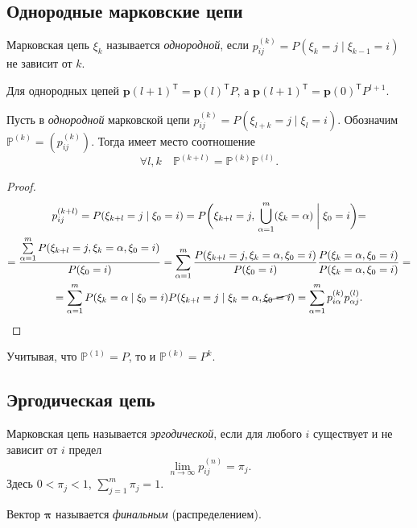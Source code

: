\subsection{Однородные марковские цепи}
\begin{definition}
  Марковская цепь $\xi_k$ называется \emph{однородной}, если $p_{ij}^{(k)} =
  P(\xi_k=j \mid \xi_{k-1}=i)$ не
  зависит от $ k $.
\end{definition}
Для однородных цепей $\mathbf{p}(l+1)^{\mathsf T} = \mathbf{p}(l)^{\mathsf T} P$, а
$\mathbf{p}(l+1)^{\mathsf T} = \mathbf{p}(0)^{\mathsf T} P^{l+1}$.

\begin{theorem}
  Пусть в \emph{однородной} марковской цепи $p_{ij}^{(k)} = P(\xi_{l+k} = j \mid
  \xi_l=i)$. Обозначим
  $\mathbb{P}^{(k)} = (p_{ij}^{(k)})$. Тогда имеет место соотношение
  \[
    \forall l, k \quad \mathbb{P}^{(k+l)} = \mathbb{P}^{(k)} \mathbb{P}^{(l)}.
  \]
\end{theorem}
\begin{proof}
  \begin{multline*}
    p_{ij}^{(k+l)} = P(\xi_{k+l}=j \mid \xi_0 = i)
    = P\biggl(\xi_{k+l}=j,\, \bigcup_{\alpha=1}^m (\xi_k=\alpha) \biggm| \xi_0 =
      i\biggl) = \\
    = \dfrac{\sum\limits_{\alpha=1}^m P(\xi_{k+l} = j, \xi_k = \alpha, \xi_0=i)}{P(\xi_0=i)}
    = \sum_{\alpha=1}^m \dfrac{P(\xi_{k+l} = j, \xi_k = \alpha, \xi_0=i)}{P(\xi_0=i)} \dfrac{P(\xi_k=\alpha, \xi_0=i)}{P(\xi_k=\alpha, \xi_0=i)} = \\
    = \sum_{\alpha=1}^m P(\xi_k=\alpha\mid\xi_0=i) P(\xi_{k+l}=j \mid \xi_k = \alpha, \cancel{\xi_0=i})
    = \sum_{\alpha=1}^m p_{i\alpha}^{(k)} p_{\alpha j}^{(l)}.
  \end{multline*}
\end{proof}
\begin{remark*}
  Учитывая, что $ \mathbb P^{(1)} = P $, то и $ \mathbb P^{(k)} = P^k $.
\end{remark*}


\subsection{Эргодическая цепь}
\begin{definition}
  Марковская цепь называется \emph{эргодической}, если для любого $ i $ существует и не зависит
  от $ i $ предел
  \[
    \lim_{n\to\infty} p_{ij}^{(n)} = \pi_{j}.
  \]
  Здесь $0 < \pi_j < 1$, $\sum\limits_{j=1}^m \pi_j = 1$.

  Вектор $\bm{\pi}$ называется \emph{финальным} (распределением).
\end{definition}

